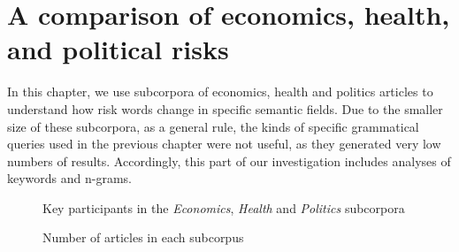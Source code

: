 
\chapter{A comparison of economics, health, and political risks}

In this chapter, we use subcorpora of economics, health and politics articles to understand how risk words change in specific semantic fields. Due to the smaller size of these subcorpora, as a general rule, the kinds of specific grammatical queries used in the previous chapter were not useful, as they generated very low numbers of results. Accordingly, this part of our investigation includes analyses of keywords and n-grams. 

            \begin{figure}[htb!]
            \centering
            \caption{Key participants in the \emph{Economics}, \emph{Health} and \emph{Politics} subcorpora}
            \label{fig:clouds}
            \end{figure}


            \begin{figure}[htb!]
            \centering
            \caption{Number of articles in each subcorpus}
            \label{fig:echepol_riskwords}
            \end{figure}

